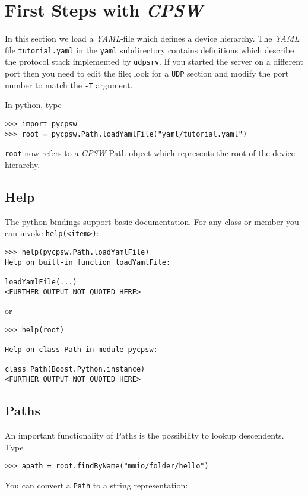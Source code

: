 \documentclass[10pt]{article}
\newcommand{\ita}[1]{\emph{#1}}
\newcommand{\cpsw}      {\ita {CPSW}}
\newcommand{\yaml}      {\ita {YAML}}
\newcommand{\Path}      {{Path}}
\newcommand{\Paths}     {{Paths}}
\newcommand{\py}        {python}
\newcommand{\udps}      {udpsrv}
\newcommand{\cod}[1] {{\tt#1}}
\newcommand{\tutyaml} {\cod{tutorial.yaml}}
\begin{document}
\section{First Steps with \cpsw}
\label{sec:firststeps}
In this section we load a \yaml{}-file which defines a device hierarchy.
The \yaml{} file \tutyaml{} in the \cod{yaml} subdirectory contains
definitions which describe the protocol stack implemented by \cod{\udps}.
If you started the server on a different port then you need to edit the
file; look for a \cod{UDP} section and modify the port number to match
the \cod{-T} argument.

In \py{}, type

\begin{verbatim}
>>> import pycpsw
>>> root = pycpsw.Path.loadYamlFile("yaml/tutorial.yaml")
\end{verbatim}

\cod{root} now refers to a \cpsw{} \Path{} object which represents
the root of the device hierarchy.

\subsection{Help}
The \py{} bindings support basic documentation. For any class or member
you can invoke \cod{help(<item>)}:
\begin{verbatim}
>>> help(pycpsw.Path.loadYamlFile)
Help on built-in function loadYamlFile:

loadYamlFile(...)
<FURTHER OUTPUT NOT QUOTED HERE>
\end{verbatim}
or
\begin{verbatim}
>>> help(root)

Help on class Path in module pycpsw:

class Path(Boost.Python.instance)
<FURTHER OUTPUT NOT QUOTED HERE>
\end{verbatim}

\subsection{Paths}

An important functionality of \Paths{} is the possibility to lookup
descendents. Type

\begin{verbatim}
>>> apath = root.findByName("mmio/folder/hello")
\end{verbatim}

You can convert a \cod{Path} to a string representation:
\end{document}
